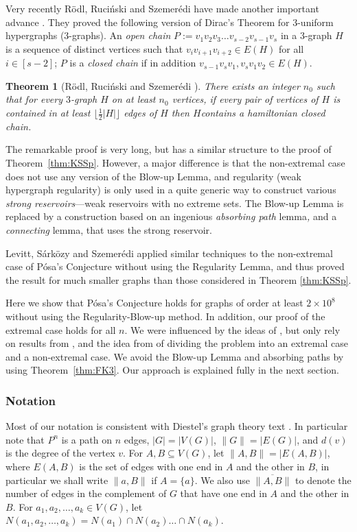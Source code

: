 \documentclass[oneside,12pt]{memoir}
\newtheorem{theorem}{Theorem}[section]
\newcommand{\n}{2\times 10^8}
\begin{document}
Very recently R\"odl, Ruci\'{n}ski and Szemer\'edi have made another 
important advance \cite{RRS1,RRS2}. They proved
the following version of Dirac's Theorem for 3-uniform hypergraphs
(3-graphs). An \emph{open chain} $P:=v_{1}v_{2}v_{3}\dots v_{s-2}v_{s-1}v_{s}$
in a 3-graph $H$ is a sequence of distinct vertices such that 
$v_{i}v_{i+1}v_{i+2}\in E(H)$ for all $i\in[s-2]$; $P$ is a \emph{closed
chain} if in addition $v_{s-1}v_{s}v_{1},v_{s}v_{1}v_{2}\in E(H)$.
\begin{theorem}[R\"odl, Ruci\'{n}ski and Szemer\'edi \cite{RRS2}]
There exists an integer $n_{0}$ such that for every $3$-graph $H$
on at least $n_{0}$ vertices, if every pair of vertices of $H$ is
contained in at least $\lfloor\frac{1}{2}|H|\rfloor$ edges of $H$
then $H$contains a hamiltonian closed chain. 
\end{theorem}
The remarkable proof is very long, but has a similar structure to
the proof of Theorem~\ref{thm:KSSp}. However, a major difference 
is that the non-extremal case does not use any version of the Blow-up Lemma, and regularity
(weak hypergraph regularity) is only used in a quite generic way to
construct various \emph{strong reservoirs}---weak reservoirs with no extreme sets. The Blow-up Lemma is replaced
by a construction based on an ingenious \emph{absorbing path }lemma\emph{,}
and a \emph{connecting} lemma, that uses the strong reservoir.

Levitt, S\'ark\"ozy and Szemer\'edi \cite{LSS} applied similar techniques 
to the non-extremal case of P\'osa's Conjecture without using the Regularity Lemma, and thus proved the result for much smaller graphs than those considered in Theorem \ref{thm:KSSp}. 

Here we show that P\'osa's Conjecture holds for graphs of order at least
$\n$ without using the Regularity-Blow-up
method. In addition, our proof of the extremal case holds for all $n$.
We were influenced by the ideas of \cite{LSS}, but only rely on results
from \cite{FK1,FK2,FK3}, and the idea from \cite{KSSp} of dividing
the problem into an extremal case and a non-extremal case.  We avoid the Blow-up Lemma and absorbing paths by using Theorem~\ref{thm:FK3}. 
 Our approach is explained fully in the
next section.

\subsubsection*{Notation}

Most of our notation is consistent with Diestel's graph theory text
\cite{Di}. In particular note that $P^{n}$ is a path on $n$ edges,
$|G|=|V(G)|$, $\|G\|=|E(G)|$, and $d(v)$ is the degree of the vertex
$v$. For $A,B\subseteq V(G)$, let $\|A,B\|=|E(A,B)|$, where $E(A,B)$ is the set of edges with one end
in $A$ and the other in $B$, in particular we shall write $\|a,B\|$ if $A=\{a\}$. We also use $\overline{\|A,B\|}$ to denote the number of edges  in the complement of $G$ that have one end in  $A$ and the other in  $B$. 
For $a_{1},a_{2},\dots,a_{k}\in V(G)$, let $N(a_{1},a_{2},\dots,a_{k})=N(a_{1})\cap N(a_{2})\dots\cap N(a_{k})$. 
\end{document}

